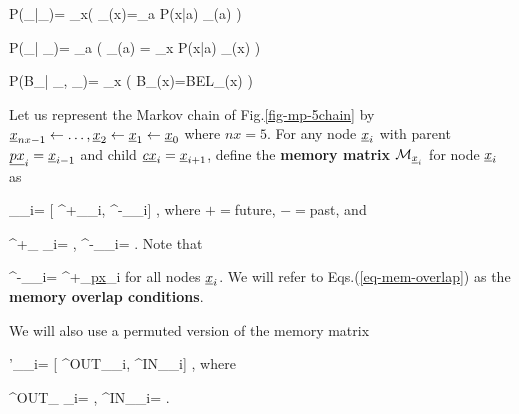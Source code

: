 \beq\color{blue}
P(\pi_{\rvb\ldart\rvx}|\pi_{\rvx\ldart\rva})=
\prod_{x}\indi\left(
\pi_{\rvb\ldart\rvx}(x)=\sum_a P(x|a)
\pi_{\rvx\ldart\rva}(a)
\right)
\label{eq-pr-pi-bar-pi}
\eeq

\beq\color{blue}
P(\lam_{\rvx\rdart \rva}|
\lam_{\rvb\rdart \rvx})=
\prod_{a}
\indi\left(
\lam_{\rvx\rdart \rva}(a)
=
\sum_x P(x|a)
\lam_{\rvb\rdart \rvx}(x)
\right)
\label{eq-pr-lam-bar-lam}
\eeq

\beq\color{blue}
P(B_\rvx|
\pi_{\rvb\ldart \rvx},
\lam_{\rvx\rdart \rva})=
\prod_x
\indi\left(
B_\rvx(x)=BEL_\rvx(x)
\right)
\eeq



Let us represent the Markov
chain of Fig.\ref{fig-mp-5chain}
by
$\rvx_{nx-1}
\larrow \ldots, \rvx_2\larrow \rvx_1\larrow \rvx_0$
where $nx=5$.
For any node 
$\rvx_i$
with
parent $\ul{px}_i=\rvx_{i-1}$
and child $\ul{cx}_i=\rvx_{i+1}$, 
define
the {\bf memory matrix}
$\calm_{\rvx_i}$
for node $\rvx_i$
as

\beq
\calm_{\rvx_i}=
[
\calm^+_{\rvx_i},
\calm^-_{\rvx_i}]
\;,
\eeq
where $+=$future, $-=$past, and 

\beq
\calm^+_{ \rvx_i}=
\;, 
\;\;\;
\calm^-_{\rvx_i}=
\;.
\eeq 
Note that

\beq
\calm^-_{\rvx_i}=
\calm^+_{\ul{px}_i}
\label{eq-mem-overlap}
\eeq
for all nodes $\rvx_i$.
We will refer to
Eqs.(\ref{eq-mem-overlap}) as
the {\bf memory overlap
conditions}.

We will also use a permuted version of the 
memory matrix

\beq
\calm'_{\rvx_i}=
[
\calm^{OUT}_{\rvx_i},
\calm^{IN}_{\rvx_i}]
\;,
\eeq
where

\beq
\calm^{OUT}_{ \rvx_i}=
\;, 
\;\;\;
\calm^{IN}_{\rvx_i}=
\;.
\eeq

